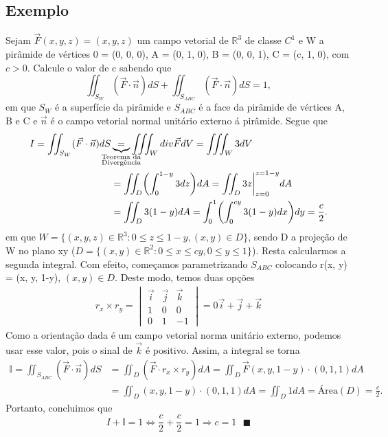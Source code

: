 \documentclass{article}
\renewcommand\qedsymbol{$\blacksquare$}
\begin{document}
 \subsection{Exemplo}Sejam $\vec{F}(x, y, z) = (x, y, z)$ um campo vetorial de $\mathbb{R}^{3}$ de classe $C^1$ e W a pir\^amide de v\'ertices 0 = (0, 0, 0),
 A = (0, 1, 0), B = (0, 0, 1), C = (c, 1, 0), com $c>0$. Calcule o valor de c sabendo que 
  $$
  \iint_{S_W}(\vec{F}\cdot \vec{n})dS + \iint_{S_{ABC}}(\vec{F}\cdot \vec{n})dS = 1,
  $$
em que $S_W$ \'e a superf\'icie da pir\^amide e $S_{ABC}$ \'e a face da pir\^amide de v\'ertices A, B e C e $\vec{n}$ \'e o campo vetorial
normal unit\'ario externo \'a pir\^amide. Segue que 
 \begin{align*}
   I = \iint_{S_{W}}(\vec{F}\cdot \vec{n})dS &\underbrace{=}_{\mathclap{\substack{\text{Teorema da} \\ \text{Diverg\^encia}}}} \iiint_{W}div \vec{F}dV = \iiint_{W}3dV \\
  &= \iint_{D}\biggl(\int_{0}^{1-y}3dz\biggr)dA = \iint_{D}3z\biggl|^{z = 1-y}_{z=0}dA \\
  &= \iint_{D}3(1-y)dA = \int_{0}^{1}\biggl(\int_{0}^{cy}3(1-y)dx\biggr)dy = \frac{c}{2}.
 \end{align*}
 em que $W = \{(x, y, z)\in \mathbb{R}^{3}: 0\leq{z}\leq{1-y}, (x, y)\in{D}\}$, sendo D a proje\c c\~ao de W no plano xy 
 ($D = \{(x, y)\in \mathbb{R}^{2}: 0\leq{x}\leq{cy}, 0\leq{y}\leq{1}\}$). Resta calcularmos a segunda integral. Com efeito,
 come\c camos parametrizando $S_{ABC}$ colocando r(x, y) = (x, y, 1-y), $(x, y)\in{D}$. Deste modo, temos duas op\c c\~oes
\begin{align*}
  r_x \times r_y = \begin{vmatrix}
    \vec{i} & \vec{j} & \vec{k} \\
    1 & 0 & 0 \\
    0 & 1 & -1
  \end{vmatrix} = 0\vec{i} + \vec{j} + \vec{k}
\end{align*}
Como a orienta\c c\~ao dada \'e um campo vetorial norma unit\'ario externo, podemos usar esse valor, pois o sinal de $\vec{k}$ \'e positivo. 
Assim, a integral se torna
\begin{align*}
  \mathbb{I} = \iint_{S_{ABC}} (\vec{F}\cdot \vec{n})dS &= \iint_{D}(\vec{F}\cdot r_x \times r_y)dA = \iint_{D}\vec{F}(x, y, 1-y)\cdot(0, 1, 1)dA \\
  &= \iint_{D}(x, y, 1-y)\cdot(0, 1, 1)dA = \iint_{D}1dA = \text{\'Area}(D) = \frac{c}{2}.
\end{align*}
Portanto, concluimos que 
  $$
  I + \mathbb{I} = 1\Longleftrightarrow \frac{c}{2}+\frac{c}{2} = 1\Rightarrow c=1 \text{    \qedsymbol}
  $$
\end{document}

